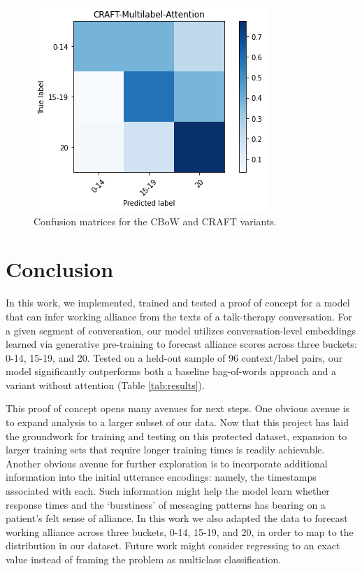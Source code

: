 \documentclass{article}
\begin{document}
\begin{figure}[]
  \includegraphics[width=0.9\columnwidth]{figs/cm-craftmulti.png}
  \caption{Confusion matrices for the CBoW and CRAFT variants.}
  \label{fig:confusion-matrices}
\end{figure}



\section{Conclusion}

In this work, we implemented, trained and tested a proof of concept for a model that can infer working alliance from the texts of a talk-therapy conversation. For a given segment of conversation, our model utilizes conversation-level embeddings learned via generative pre-training to forecast alliance scores across three buckets: 0-14, 15-19, and 20. Tested on a held-out sample of 96 context/label pairs, our model significantly outperforms both a baseline bag-of-words approach and a variant without attention (Table \ref{tab:results}).

This proof of concept opens many avenues for next steps. One obvious avenue is to expand analysis to a larger subset of our data. Now that this project has laid the groundwork for training and testing on this protected dataset, expansion to larger training sets that require longer training times is readily achievable. Another obvious avenue for further exploration is to incorporate additional information into the initial utterance encodings: namely, the timestamps associated with each. Such information might help the model learn whether response times and the `burstiness' of messaging patterns has bearing on a patient's felt sense of alliance. In this work we also adapted the data to forecast working alliance across three buckets, 0-14, 15-19, and 20, in order to map to the distribution in our dataset. Future work might consider regressing to an exact value instead of framing the problem as multiclass classification.
\end{document}
